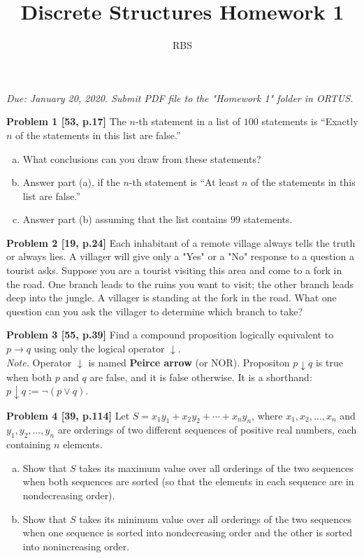 \documentclass[jou]{apa6}
\title{Discrete Structures \textendash{} Homework 1}
\author{RBS}
\begin{document}
\maketitle
\noindent
{\em Due: January 20, 2020. Submit PDF file to the "Homework 1" folder in ORTUS.}

\vspace{2ex}
{\bf Problem 1 [53, p.17]} The $n$-th statement in a list of $100$ statements is
``Exactly $n$ of the statements in this list are false.'' 
\begin{enumerate}[(a)]
\item What conclusions can you draw from these statements?
\item Answer part (a), if the $n$-th statement is ``At least $n$ of 
the statements in this list are false.''
\item Answer part (b) assuming that the list contains $99$ statements.
\end{enumerate}

\vspace{2ex}
{\bf Problem 2 [19, p.24]} Each inhabitant of a remote village always tells the 
truth or always lies. A villager will give only a "Yes" or a "No" response
to a question a tourist asks. Suppose you are a tourist visiting this area and come
to a fork in the road. One branch leads to the ruins you want to visit; the
other branch leads deep into the jungle. A villager is standing at the fork in the road. 
What one question can you ask the villager to determine which branch to take?

\vspace{2ex}
{\bf Problem 3 [55, p.39]} 
Find a compound proposition logically equivalent to $p \rightarrow q$ using 
only the logical operator $\downarrow$.\\
{\em Note.} Operator $\downarrow$ is named {\bf Peirce arrow} (or NOR). 
Propositon $p \downarrow q$ is true when both $p$ and $q$ are false, and it is 
false otherwise. It is a shorthand: $p \downarrow q := \neg(p \vee q)$. 

\vspace{2ex}
{\bf Problem 4 [39, p.114]} 
Let $S = x_1y_1 + x_2y_2 + \cdots + x_ny_n$, where $x_1,x_2,\ldots,x_n$
and $y_1,y_2,\ldots,y_n$ are orderings of two different sequences
of positive real numbers, each containing $n$ elements.
\begin{enumerate}[(a)]
\item Show that $S$ takes its maximum value over all orderings of the two 
sequences when both sequences are sorted (so that the elements in each 
sequence are in nondecreasing order). 
\item Show that $S$ takes its minimum value over all orderings of the two 
sequences when one sequence is sorted into nondecreasing order and the other 
is sorted into nonincreasing order.
\end{enumerate}
\end{document}
